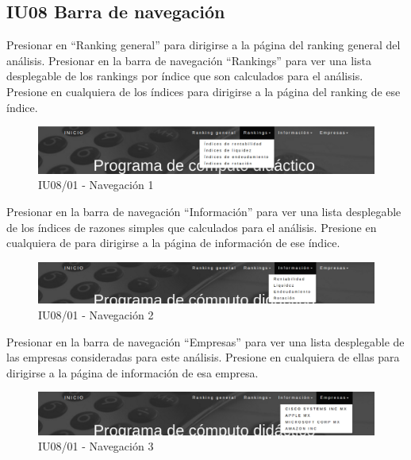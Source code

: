 \hypertarget{IU08}{\subsection{IU08 Barra de navegación}}

    Presionar en “Ranking general” para dirigirse a la página del ranking general del análisis.
    Presionar en la barra de navegación “Rankings” para ver una lista desplegable de los rankings
    por índice que son calculados para el análisis.
    Presione en cualquiera de los índices para dirigirse a la página del ranking de ese índice.

    \begin{figure}[H]
        \begin{center}
            \includegraphics[scale=0.3]{pantallas/Navegacion1}
            \caption{IU08/01 - Navegación 1}
        \end{center}
    \end{figure}


    Presionar en la barra de navegación “Información” para ver una lista desplegable
    de los índices de razones simples que calculados para el análisis.
    Presione en cualquiera de para dirigirse a la página de información de ese índice.

    \begin{figure}[H]
        \begin{center}
            \includegraphics[scale=0.3]{pantallas/Navegacion2}
            \caption{IU08/01 - Navegación 2}
        \end{center}
    \end{figure}


    Presionar en la barra de navegación “Empresas” para ver una lista desplegable
    de las empresas consideradas para este análisis. Presione en cualquiera de
    ellas para dirigirse a la página de información de esa empresa.

    \begin{figure}[H]
        \begin{center}
            \includegraphics[scale=0.3]{pantallas/Navegacion3}
            \caption{IU08/01 - Navegación 3}
        \end{center}
    \end{figure}
